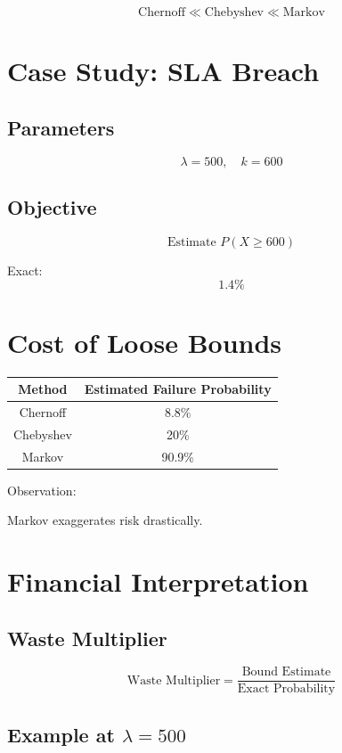 \documentclass[11pt]{article}
\begin{document}
\[
\text{Chernoff} \ll \text{Chebyshev} \ll \text{Markov}
\]

\section{Case Study: SLA Breach}

\subsection{Parameters}

\[
\lambda = 500,\quad k = 600
\]

\subsection{Objective}

\[
\text{Estimate } P(X \ge 600)
\]

Exact:
\[
1.4\%
\]

\section{Cost of Loose Bounds}

\begin{center}
\begin{tabular}{c|c}
Method & Estimated Failure Probability \\ \hline
Chernoff & 8.8\% \\
Chebyshev & 20\% \\
Markov & 90.9\%
\end{tabular}
\end{center}

Observation:

Markov exaggerates risk drastically.

\section{Financial Interpretation}

\subsection{Waste Multiplier}

\[
\text{Waste Multiplier} =
\frac{\text{Bound Estimate}}{\text{Exact Probability}}
\]

\subsection{Example at $\lambda = 500$}
\end{document}
